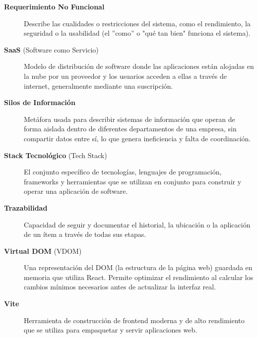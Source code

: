 \documentclass[12pt,letterpaper,spanish]{report}
\begin{document}
\begin{description}
  \item[\textbf{Requerimiento No Funcional}] Describe las cualidades o restricciones del sistema, como el rendimiento, la seguridad o la usabilidad (el ''como'' o "qué tan bien" funciona el sistema).

  \item[\textbf{SaaS} (Software como Servicio)] Modelo de distribución de software donde las aplicaciones están alojadas en la nube por un proveedor y los usuarios acceden a ellas a través de internet, generalmente mediante una suscripción.

  \item[\textbf{Silos de Información}] Metáfora usada para describir sistemas de información que operan de forma aislada dentro de diferentes departamentos de una empresa, sin compartir datos entre sí, lo que genera ineficiencia y falta de coordinación.

    \item[\textbf{Stack Tecnológico} (Tech Stack)] El conjunto específico de tecnologías, lenguajes de programación, frameworks y herramientas que se utilizan en conjunto para construir y operar una aplicación de software.

  \item[\textbf{Trazabilidad}] Capacidad de seguir y documentar el historial, la ubicación o la aplicación de un ítem a través de todas sus etapas.

  \item[\textbf{Virtual DOM} (VDOM)] Una representación del DOM (la estructura de la página web) guardada en memoria que utiliza React. Permite optimizar el rendimiento al calcular los cambios mínimos necesarios antes de actualizar la interfaz real.

  \item[\textbf{Vite}] Herramienta de construcción de frontend moderna y de alto rendimiento que se utiliza para empaquetar y servir aplicaciones web.

\end{description}


\end{document}

